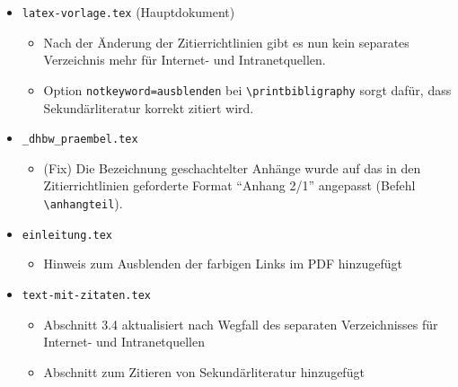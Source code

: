 \begin{itemize}
\item \verb|latex-vorlage.tex| (Hauptdokument)
\begin{itemize}
\item Nach der Änderung der Zitierrichtlinien gibt es nun kein separates Verzeichnis mehr für Internet- und Intranetquellen.
\item Option \verb|notkeyword=ausblenden| bei \verb|\printbibligraphy| sorgt dafür, dass Sekundärliteratur korrekt zitiert wird.
\end{itemize}

\item \verb|_dhbw_praembel.tex|
\begin{itemize}
\item (Fix) Die Bezeichnung geschachtelter Anhänge wurde auf das in den Zitierrichtlinien geforderte Format \enquote{Anhang 2/1} angepasst (Befehl \verb|\anhangteil|).
\end{itemize}

\item \verb|einleitung.tex|
\begin{itemize}
\item Hinweis zum Ausblenden der farbigen Links im PDF hinzugefügt
\end{itemize}

\item \verb|text-mit-zitaten.tex|
\begin{itemize}
\item Abschnitt 3.4 aktualisiert nach Wegfall des separaten Verzeichnisses für Internet- und Intranetquellen
\item Abschnitt zum Zitieren von Sekundärliteratur hinzugefügt
\end{itemize}

\end{itemize}
